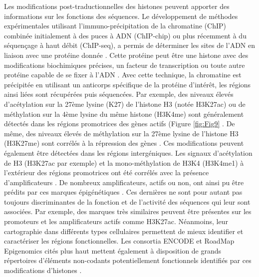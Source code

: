 Les modifications post-traductionnelles des histones peuvent apporter des informations sur les fonctions des séquences. Le développement de méthodes expérimentales utilisant l’immuno-précipitation de la chromatine (ChIP) combinée initialement à des puces à ADN (ChIP-chip) ou plus récemment à du séquençage à haut débit (\acrshort{ChIP-seq}), a permis de déterminer les sites de l’ADN en liaison avec une protéine donnée \citep{ren_genome-wide_2000, barski_high-resolution_2007}. Cette protéine peut être une histone avec des modifications biochimiques précises, un facteur de transcription ou toute autre protéine capable de se fixer à l’ADN \citep{visel_chip-seq_2009}. Avec cette technique, la chromatine est précipitée en utilisant un anticorps spécifique de la protéine d’intérêt, les régions ainsi liées sont récupérées puis séquencées. Par exemple, des niveaux élevés d'acétylation sur la 27ème lysine (K27) de l’histone H3 (notée H3K27ac) ou de méthylation sur la 4ème lysine du même histone (H3K4me) sont généralement détectés dans les régions promotrices des gènes actifs (Figure \ref{fig:Fig9} \citep{bernstein_genomic_2005}. De même, des niveaux élevés de méthylation sur la 27ème lysine de l’histone H3 (H3K27me) sont corrélés à la répression des gènes \citep{lee_control_2006}. Ces modifications peuvent également être détectées dans les régions intergéniques. Les signaux d'acétylation de H3 (H3K27ac par exemple) et la mono-méthylation de H3K4 (H3K4me1) à l'extérieur des régions promotrices ont été corrélés avec la présence d’\glspl{amplificateur} \citep{heintzman_distinct_2007}. De nombreux \glspl{amplificateur}, actifs ou non, ont ainsi pu être prédits par ces marques épigénétiques \citep{creyghton_histone_2010}. Ces dernières ne sont pour autant pas toujours discriminantes de la fonction et de l’activité des séquences qui leur sont associées. Par exemple, des marques très similaires peuvent être présentes sur les promoteurs et les \glspl{amplificateur} actifs comme H3K27ac. Néanmoins, leur cartographie dans différents types cellulaires permettent de mieux identifier et caractériser les régions fonctionnelles. Les consortia ENCODE et RoadMap Epigenomics cités plus haut mettent également à disposition de grands répertoires d’éléments non-codants potentiellement fonctionnels identifiés par ces modifications d’histones \citep{davis_encyclopedia_2018, roadmap_epigenomics_consortium_integrative_2015}.

